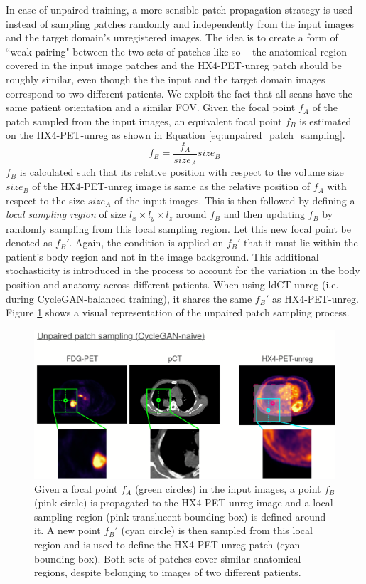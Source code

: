 In case of unpaired training, a more sensible patch propagation strategy is used instead of sampling patches randomly and independently from the input images and the target domain's unregistered images. The idea is to create a form of ``weak pairing" between the two sets of patches like so -- the anatomical region covered in the input image patches and the HX4-PET-unreg patch should be roughly similar, even though the the input and the target domain images correspond to two different patients. We exploit the fact that all scans have the same patient orientation and a similar FOV. Given the focal point $f_A$ of the patch sampled from the input images, an equivalent focal point $f_B$ is estimated on the HX4-PET-unreg as shown in Equation \ref{eq:unpaired_patch_sampling}.
\begin{equation}
    f_B = \frac{f_A}{size_A} size_B
    \label{eq:unpaired_patch_sampling}
\end{equation}
$f_B$ is calculated such that its relative position with respect to the volume size $size_B$ of the HX4-PET-unreg image is same as the relative position of $f_A$ with respect to the size $size_A$ of the input images. This is then followed by defining a \textit{local sampling region} of size $l_x \times l_y \times l_z$ around $f_B$ and then updating $f_B$ by randomly sampling from this local sampling region. Let this new focal point be denoted as $f_B'$. Again, the condition is applied on $f_B'$ that it must lie within the patient's body region and not in the image background. This additional stochasticity is introduced in the process to account for the variation in the body position and anatomy across different patients. When using ldCT-unreg (i.e. during CycleGAN-balanced training), it shares the same $f_B'$ as HX4-PET-unreg. Figure \ref{fig:unpaired_patch_sampling} shows a visual representation of the unpaired patch sampling process.

\begin{figure}[h!]
    \centering
    \includegraphics[width=\linewidth]{figures/Data/patch_sampling/unpaired_patch_sampling.png}
    \caption{Given a focal point $f_A$ (green circles) in the input images, a point $f_B$ (pink circle) is propagated to the HX4-PET-unreg image and a local sampling region (pink translucent bounding box) is defined around it. A new point $f_B'$ (cyan circle) is then sampled from this local region and is used to define the HX4-PET-unreg patch (cyan bounding box). Both sets of patches cover similar anatomical regions, despite belonging to images of two different patients.}
    \label{fig:unpaired_patch_sampling}
\end{figure}

